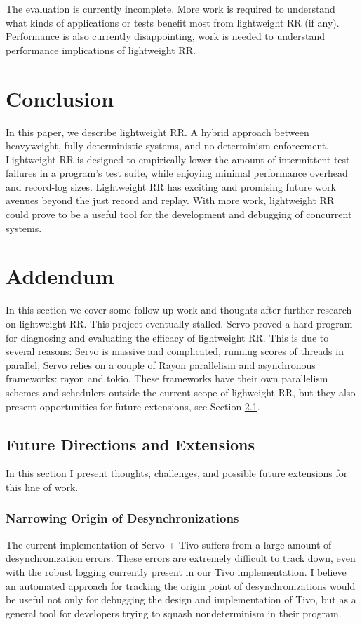 The evaluation is currently incomplete. More work is required to understand what kinds
of applications or tests benefit most from lightweight RR (if any). Performance is also
currently disappointing, work is needed to understand performance implications of lightweight
RR.

\section{Conclusion}
In this paper, we describe lightweight RR. A hybrid approach between heavyweight, fully
deterministic systems, and no determinism enforcement. Lightweight RR is designed to
empirically lower the amount of intermittent test failures in a program's test suite,
while enjoying minimal performance overhead and record-log sizes. Lightweight
RR has exciting and promising future work avenues beyond the just record and replay.
With more work, lightweight RR could prove to be a useful tool for the development
and debugging of concurrent systems.

\section{Addendum}
In this section we cover some follow up work and thoughts after further research on lightweight RR. This project eventually stalled. Servo proved a hard program for diagnosing and evaluating the efficacy of lightweight RR. This is due to several reasons: Servo is massive and complicated, running scores of threads in parallel, Servo relies on a couple of Rayon parallelism and asynchronous frameworks: rayon and tokio. These frameworks have their own parallelism schemes and schedulers outside the current scope of lighweight RR, but they also present opportunities for future extensions, see Section \ref{sec:tivo-future}.


\subsection{Future Directions and Extensions} \label{sec:tivo-future}
In this section I present thoughts, challenges, and possible future extensions for this line of work.

\subsubsection{Narrowing Origin of Desynchronizations}
The current implementation of Servo + Tivo suffers from a large amount of desynchronization errors. These errors are extremely difficult to track down, even with the robust logging currently present in our Tivo implementation. I believe an automated approach for tracking the origin point of desynchronizations would be useful not only for debugging the design and implementation of Tivo, but as a general tool for developers trying to squash nondeterminism in their program.

